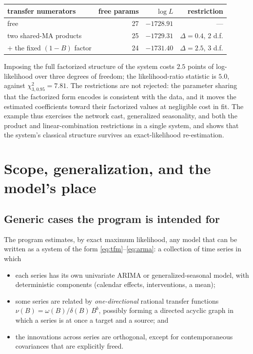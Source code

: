 \documentclass[11pt,a4paper]{article}
\theoremstyle{plain}
\theoremstyle{remark}
\begin{document}
\begin{center}
\begin{tabular}{lrrr}
\toprule
transfer numerators & free params & $\log L$ & restriction \\
\midrule
free                                   & 27 & $-1728.91$ & --- \\
two shared-MA products                 & 25 & $-1729.31$ & $\Delta=0.4$, 2 d.f. \\
$+$ the fixed $(1-B)$ factor           & 24 & $-1731.40$ & $\Delta=2.5$, 3 d.f. \\
\bottomrule
\end{tabular}
\end{center}

Imposing the full factorized structure of the system costs $2.5$ points of
log-likelihood over three degrees of freedom; the likelihood-ratio statistic is
$5.0$, against $\chi^2_{3,0.95}=7.81$. The restrictions are not rejected: the
parameter sharing that the factorized form encodes is consistent with the data, and
it moves the estimated coefficients toward their factorized values at negligible cost
in fit. The example thus exercises the network cast, generalized seasonality, and
both the product and linear-combination restrictions in a single system, and shows
that the system's classical structure survives an exact-likelihood re-estimation.

\section{Scope, generalization, and the model's place}
\label{sec:scope}

\subsection{Generic cases the program is intended for}

The program estimates, by exact maximum likelihood, any model that can be written as
a system of the form \eqref{eq:tfm}--\eqref{eq:arma}: a collection of time series in
which

\begin{itemize}
\item each series has its own univariate ARIMA or generalized-seasonal model, with
  deterministic components (calendar effects, interventions, a mean);
\item some series are related by \emph{one-directional} rational transfer functions
  $\nu(B)=\omega(B)/\delta(B)\,B^b$, possibly forming a directed acyclic graph in
  which a series is at once a target and a source; and
\item the innovations across series are orthogonal, except for contemporaneous
  covariances that are explicitly freed.
\end{itemize}
\end{document}
